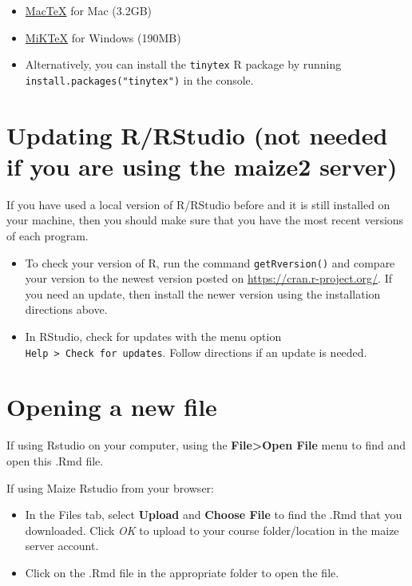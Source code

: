\documentclass[
]{book}
\begin{document}
\begin{itemize}
\item
  \href{https://www.tug.org/mactex/}{MacTeX} for Mac (3.2GB)
\item
  \href{https://miktex.org/download}{MiKTeX} for Windows (190MB)
\item
  Alternatively, you can install the \texttt{tinytex} R package by running
  \texttt{install.packages("tinytex")} in the console.
\end{itemize}

\hypertarget{updating-rrstudio-not-needed-if-you-are-using-the-maize2-server}{%
\section{Updating R/RStudio (not needed if you are using the maize2 server)}\label{updating-rrstudio-not-needed-if-you-are-using-the-maize2-server}}

If you have used a local version of R/RStudio before and it is still installed on your machine, then you should make sure that you have the most recent versions of each program.

\begin{itemize}
\item
  To check your version of R, run the command \texttt{getRversion()} and compare your version to the newest version posted on \url{https://cran.r-project.org/}. If you need an update, then install the newer version using the installation directions above.
\item
  In RStudio, check for updates with the menu option \texttt{Help\ \textgreater{}\ Check\ for\ updates}. Follow directions if an update is needed.
\end{itemize}

\hypertarget{opening-a-new-file}{%
\section{Opening a new file}\label{opening-a-new-file}}

If using Rstudio on your computer, using the \textbf{File\textgreater Open File} menu to find and open this .Rmd file.

If using Maize Rstudio from your browser:

\begin{itemize}
\item
  In the Files tab, select \textbf{Upload} and \textbf{Choose File} to find the .Rmd that you downloaded. Click \emph{OK} to upload to your course folder/location in the maize server account.
\item
  Click on the .Rmd file in the appropriate folder to open the file.
\end{itemize}
\end{document}
